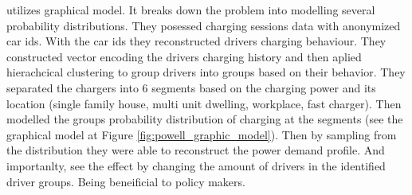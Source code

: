  utilizes graphical model. It breaks down the problem into modelling several probability distributions. They posessed charging sessions data with anonymized car ids. With the car ids they reconstructed drivers charging behaviour. They constructed vector encoding the drivers charging history and then aplied hierachcical clustering to group drivers into groups based on their behavior. They separated the chargers into 6 segments based on the charging power and its location (single family house, multi unit dwelling, workplace, fast charger). Then modelled the groups probability distribution of charging at the segments (see the graphical model at Figure \ref{fig:powell_graphic_model}). Then by sampling from the distribution they were able to reconstruct the power demand profile. And importanlty, see the effect by changing the amount of drivers in the identified driver groups. Being beneificial to policy makers.











